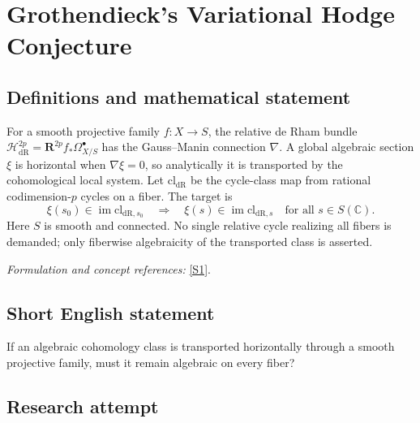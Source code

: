 \documentclass[11pt,a4paper]{article}
\newcommand{\C}{\mathbb{C}}
\newcommand{\sref}[2]{\hyperlink{source:#1:#2}{[S#2]}}
\newif\ifshowcatalogue
\newcommand{\cataloguescope}[1]{\ifshowcatalogue
 \paragraph{Exact scope in the supplied catalogue.}
 \begin{quote}\small #1\end{quote}\fi}
\numberwithin{equation}{section}
\begin{document}
\setcounter{section}{0}
\clearpage
\section*{\texorpdfstring{Grothendieck's Variational Hodge Conjecture}{Grothendieck's Variational Hodge Conjecture}}\label{30006758}
\subsection{Definitions and mathematical statement}
For a smooth projective family $f:X\to S$, the relative de Rham bundle
$\mathcal H^{2p}_{\mathrm{dR}}=\mathbf R^{2p}f_*\Omega^\bullet_{X/S}$ has the Gauss--Manin connection $\nabla$. A global algebraic section $\xi$ is horizontal when $\nabla\xi=0$, so analytically it is transported by the cohomological local system. Let $\mathrm{cl}_{\mathrm{dR}}$ be the cycle-class map from rational codimension-$p$ cycles on a fiber. The target is
\[
 \xi(s_0)\in\operatorname{im}\mathrm{cl}_{\mathrm{dR},s_0}
 \quad\Longrightarrow\quad
 \xi(s)\in\operatorname{im}\mathrm{cl}_{\mathrm{dR},s}\quad\text{for all }s\in S(\C).
\]
Here $S$ is smooth and connected. No single relative cycle realizing all fibers is demanded; only fiberwise algebraicity of the transported class is asserted.
\par\smallskip\textit{Formulation and concept references:} \sref{30006758}{1}.
\cataloguescope{For every smooth projective morphism f:X->S of smooth connected complex algebraic varieties, every integer p>=0, and every global algebraic horizontal section xi of the relative algebraic de Rham cohomology bundle R\textasciicircum{}(2p)f\_*Omega\textasciicircum{}.\_(X/S) for the Gauss-Manin connection, if xi(s0) is the de Rham cycle class of a rational algebraic codimension-p cycle on one fiber X\_s0, then xi(s) is such a rational algebraic cycle class on every fiber X\_s for s in S(C).}
\subsection{Short English statement}
If an algebraic cohomology class is transported horizontally through a smooth projective family, must it remain algebraic on every fiber?
\subsection{Research attempt}
\end{document}
